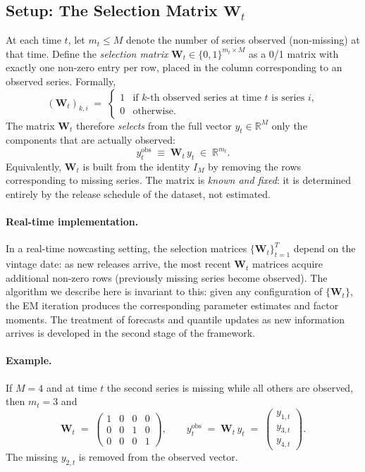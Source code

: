 \documentclass[11pt, a4paper, oneside]{article}
\begin{document}
\subsection{Setup: The Selection Matrix \texorpdfstring{$\mathbf{W}_t$}{Wt}}
\label{subsec:selection-matrix}

At each time $t$, let $m_t \leq M$ denote the number of series
observed (non-missing) at that time. Define the \emph{selection matrix}
$\mathbf{W}_t \in \{0, 1\}^{m_t \times M}$ as a 0/1 matrix with
exactly one non-zero entry per row, placed in the column corresponding
to an observed series. Formally,
\[
(\mathbf{W}_t)_{k, i} \;=\; \begin{cases} 1 & \text{if $k$-th observed series at time $t$ is series $i$}, \\ 0 & \text{otherwise}. \end{cases}
\]
The matrix $\mathbf{W}_t$ therefore \emph{selects} from the full vector
$y_t \in \mathbb{R}^M$ only the components that are actually observed:
\[
y_t^{\mathrm{obs}} \;\equiv\; \mathbf{W}_t\, y_t \;\in\; \mathbb{R}^{m_t}.
\]
Equivalently, $\mathbf{W}_t$ is built from the identity $I_M$ by
removing the rows corresponding to missing series. The matrix is
\emph{known and fixed}: it is determined entirely by the release
schedule of the dataset, not estimated.

\paragraph{Real-time implementation.}
In a real-time nowcasting setting, the selection matrices
$\{\mathbf{W}_t\}_{t=1}^T$ depend on the vintage date: as new
releases arrive, the most recent $\mathbf{W}_t$ matrices acquire
additional non-zero rows (previously missing series become
observed). The algorithm we describe here is invariant to this:
given any configuration of $\{\mathbf{W}_t\}$, the EM iteration
produces the corresponding parameter estimates and factor moments.
The treatment of forecasts and quantile updates as new information
arrives is developed in the second stage of the framework.

\paragraph{Example.}
If $M = 4$ and at time $t$ the second series is missing while all
others are observed, then $m_t = 3$ and
\[
\mathbf{W}_t \;=\; \begin{pmatrix}
1 & 0 & 0 & 0 \\
0 & 0 & 1 & 0 \\
0 & 0 & 0 & 1
\end{pmatrix},
\qquad
y_t^{\mathrm{obs}} \;=\; \mathbf{W}_t\, y_t \;=\; \begin{pmatrix} y_{1,t} \\ y_{3,t} \\ y_{4,t} \end{pmatrix}.
\]
The missing $y_{2,t}$ is removed from the observed vector.
\end{document}
